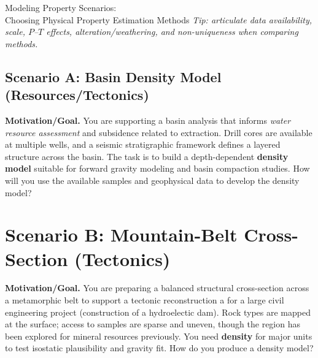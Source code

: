 \begin{activity}{Modeling Property Scenarios:\\Choosing Physical Property Estimation Methods}
\textit{Tip: articulate data availability, scale, $P$--$T$ effects, alteration/weathering, and non-uniqueness when comparing methods.}


\newpage
\subsection*{Scenario A: Basin Density Model (Resources/Tectonics)}
\noindent\textbf{Motivation/Goal.} You are supporting a basin analysis that informs \emph{water resource assessment} and subsidence related to extraction. Drill cores are available at multiple wells, and a seismic stratigraphic framework defines a layered structure across the basin. The task is to build a depth-dependent \textbf{density model} suitable for forward gravity modeling and basin compaction studies.  How will you use the available samples and geophysical data to develop the density model?

\yourplan{}

\newpage
\section*{Scenario B: Mountain-Belt Cross-Section (Tectonics)}
\noindent\textbf{Motivation/Goal.} You are preparing a balanced structural cross-section across a metamorphic belt to support a tectonic reconstruction a for a large civil engineering project (construction of a hydroelectic dam). Rock types are mapped at the surface; access to samples are sparse and uneven, though the region has been explored for mineral resources previously. You need \textbf{density} for major units to test isostatic plausibility and gravity fit.  How do you produce a density model?


\end{activity}
